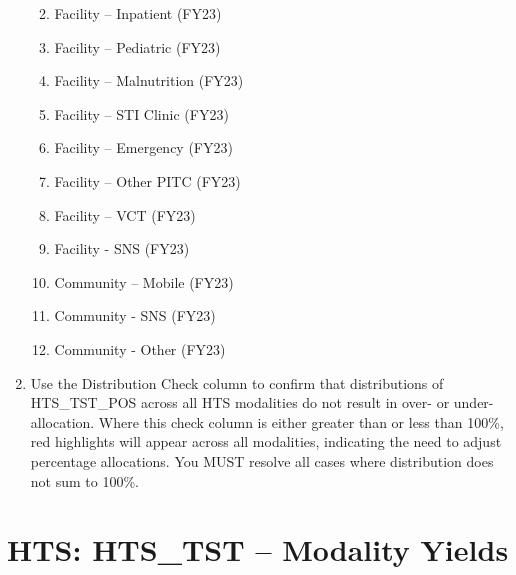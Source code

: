 \documentclass[
  openany]{book}
\begin{document}
\begin{enumerate}
  \begin{enumerate}
  \def\labelenumii{\alph{enumii}.}
  \item
    Facility -- Inpatient (FY23)
  \item
    Facility -- Pediatric (FY23)
  \item
    Facility -- Malnutrition (FY23)
  \item
    Facility -- STI Clinic (FY23)
  \item
    Facility -- Emergency (FY23)
  \item
    Facility -- Other PITC (FY23)
  \item
    Facility -- VCT (FY23)
  \item
    Facility - SNS (FY23)
  \item
    Community -- Mobile (FY23)
  \item
    Community - SNS (FY23)
  \item
    Community - Other (FY23)
  \end{enumerate}
\item
  Use the Distribution Check column to confirm that distributions of HTS\_TST\_POS across all HTS modalities do not result in over- or under-allocation. Where this check column is either greater than or less than 100\%, red highlights will appear across all modalities, indicating the need to adjust percentage allocations. You MUST resolve all cases where distribution does not sum to 100\%.
\end{enumerate}

\hypertarget{hts-hts_tst-modality-yields}{%
\section{HTS: HTS\_TST -- Modality Yields}\label{hts-hts_tst-modality-yields}}
\end{document}
